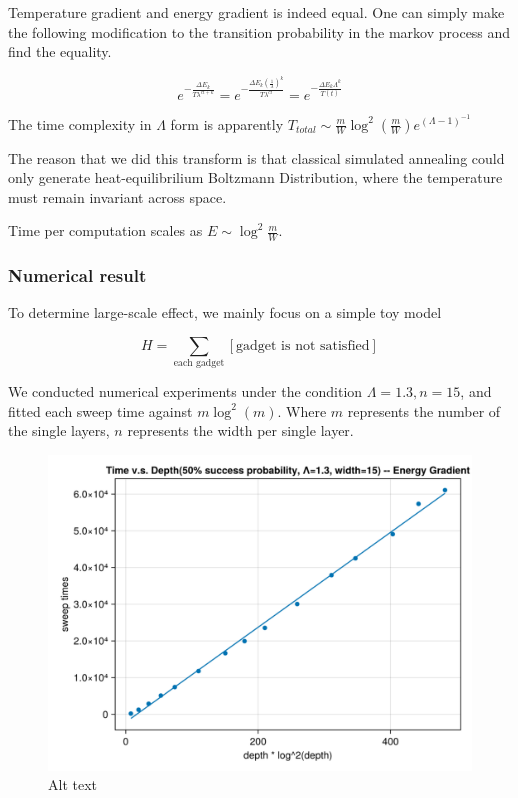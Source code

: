 \documentclass[twocolumn,superscriptaddress,english,showpacs,longbibliography]{revtex4-2}
\begin{document}
Temperature gradient and energy gradient is indeed equal. One can simply
make the following modification to the transition probability in the
markov process and find the equality.

\[e^{-\frac{\Delta E_k}{T\lambda^{ct+k}}} = e^{-\frac{\Delta E_k(\frac{1}{\lambda})^k}{T\lambda^{ct}}} = e^{-\frac{\Delta E_k \Lambda^k}{T(t)}}\]

The time complexity in $\Lambda$ form is apparently
$T_{total} \sim \frac{m}{W}\log^2(\frac{m}{W})e^{(\Lambda-1)^{-1}}$

The reason that we did this transform is that classical simulated
annealing could only generate heat-equilibrilium Boltzmann Distribution,
where the temperature must remain invariant across space.

Time per computation scales as $E \sim \log^2 \frac{m}{W}$.

\subsubsection{Numerical result}\label{numerical-result}

To determine large-scale effect, we mainly focus on a simple toy model

\[
H = \sum_{\text{each gadget}} [\text{gadget is not satisfied}]
\]

We conducted numerical experiments under the condition
$\Lambda = 1.3, n = 15$, and fitted each sweep time against
$m \log^2(m)$. Where $m$ represents the number of the single layers,
$n$ represents the width per single layer.

\begin{figure}
\centering
\includegraphics[width=\columnwidth]{../notes/images/toy_model_gradient_time_vs_depth_1_3.png}
\caption{Alt text}
\end{figure}
\end{document}
